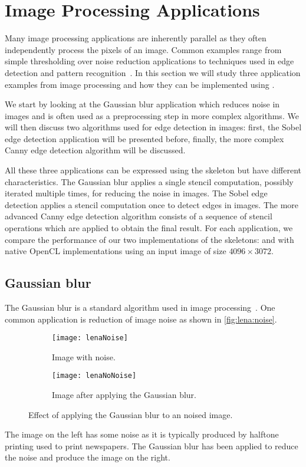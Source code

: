 \section{Image Processing Applications}
\label{sec:imageProcessing}
Many image processing applications are inherently parallel as they often independently process the pixels of an image.
Common examples range from simple thresholding over noise reduction applications to techniques used in edge detection and pattern recognition~\cite{Umbaugh1997}.
In this section we will study three application examples from image processing and how they can be implemented using \SkelCL.

We start by looking at the Gaussian blur application which reduces noise in images and is often used as a preprocessing step in more complex algorithms.
We will then discuss two algorithms used for edge detection in images:
first, the Sobel edge detection application will be presented before, finally, the more complex Canny edge detection algorithm will be discussed.

All these three applications can be expressed using the \stencil skeleton but have different characteristics.
The Gaussian blur applies a single stencil computation, possibly iterated multiple times, for reducing the noise in images.
The Sobel edge detection applies a stencil computation once to detect edges in images.
The more advanced Canny edge detection algorithm consists of a sequence of stencil operations which are applied to obtain the final result.
For each application, we compare the performance of our two implementations of the \stencil skeletons:  and  with native OpenCL implementations using an input image of size $4096 \times 3072$.










\subsection{Gaussian blur}
\label{sec:gauss}
The Gaussian blur is a standard algorithm used in image processing~\cite{Umbaugh1997}.
One common application is reduction of image noise as shown in \autoref{fig:lena:noise}.
%
\begin{figure}[tb]
  \centering
  \begin{subfigure}[t]{.45\textwidth}
    \texttt{[image: lenaNoise]}
    \caption{Image with noise.}
    \label{fig:lena:noise:yes}
  \end{subfigure}
  \hfill
  \begin{subfigure}[t]{.45\textwidth}
    \texttt{[image: lenaNoNoise]}
    \caption{Image after applying the Gaussian blur.}
    \label{fig:lena:noise:no}
  \end{subfigure}
  \caption{Effect of applying the Gaussian blur to an noised image.}
  \label{fig:lena:noise}
\end{figure}
%
The image on the left has some noise as it is typically produced by halftone printing used to print newspapers.
The Gaussian blur has been applied to reduce the noise and produce the image on the right.

